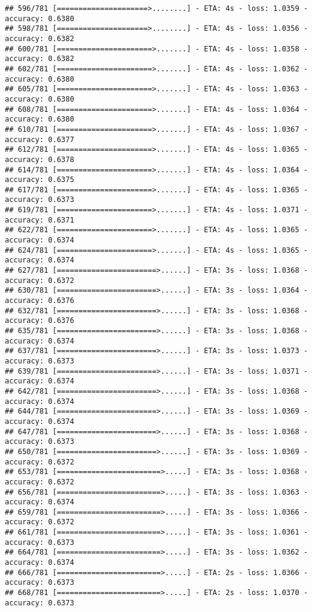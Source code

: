 \documentclass[
]{article}
\begin{document}
\begin{verbatim}
## 596/781 [=====================>........] - ETA: 4s - loss: 1.0359 - accuracy: 0.6380
## 598/781 [=====================>........] - ETA: 4s - loss: 1.0356 - accuracy: 0.6382
## 600/781 [======================>.......] - ETA: 4s - loss: 1.0358 - accuracy: 0.6382
## 602/781 [======================>.......] - ETA: 4s - loss: 1.0362 - accuracy: 0.6380
## 605/781 [======================>.......] - ETA: 4s - loss: 1.0363 - accuracy: 0.6380
## 608/781 [======================>.......] - ETA: 4s - loss: 1.0364 - accuracy: 0.6380
## 610/781 [======================>.......] - ETA: 4s - loss: 1.0367 - accuracy: 0.6377
## 612/781 [======================>.......] - ETA: 4s - loss: 1.0365 - accuracy: 0.6378
## 614/781 [======================>.......] - ETA: 4s - loss: 1.0364 - accuracy: 0.6375
## 617/781 [======================>.......] - ETA: 4s - loss: 1.0365 - accuracy: 0.6373
## 619/781 [======================>.......] - ETA: 4s - loss: 1.0371 - accuracy: 0.6371
## 622/781 [======================>.......] - ETA: 4s - loss: 1.0365 - accuracy: 0.6374
## 624/781 [======================>.......] - ETA: 4s - loss: 1.0365 - accuracy: 0.6374
## 627/781 [=======================>......] - ETA: 3s - loss: 1.0368 - accuracy: 0.6372
## 630/781 [=======================>......] - ETA: 3s - loss: 1.0364 - accuracy: 0.6376
## 632/781 [=======================>......] - ETA: 3s - loss: 1.0368 - accuracy: 0.6376
## 635/781 [=======================>......] - ETA: 3s - loss: 1.0368 - accuracy: 0.6374
## 637/781 [=======================>......] - ETA: 3s - loss: 1.0373 - accuracy: 0.6373
## 639/781 [=======================>......] - ETA: 3s - loss: 1.0371 - accuracy: 0.6374
## 642/781 [=======================>......] - ETA: 3s - loss: 1.0368 - accuracy: 0.6374
## 644/781 [=======================>......] - ETA: 3s - loss: 1.0369 - accuracy: 0.6374
## 647/781 [=======================>......] - ETA: 3s - loss: 1.0368 - accuracy: 0.6373
## 650/781 [=======================>......] - ETA: 3s - loss: 1.0369 - accuracy: 0.6372
## 653/781 [========================>.....] - ETA: 3s - loss: 1.0368 - accuracy: 0.6372
## 656/781 [========================>.....] - ETA: 3s - loss: 1.0363 - accuracy: 0.6374
## 659/781 [========================>.....] - ETA: 3s - loss: 1.0366 - accuracy: 0.6372
## 661/781 [========================>.....] - ETA: 3s - loss: 1.0361 - accuracy: 0.6373
## 664/781 [========================>.....] - ETA: 3s - loss: 1.0362 - accuracy: 0.6374
## 666/781 [========================>.....] - ETA: 2s - loss: 1.0366 - accuracy: 0.6373
## 668/781 [========================>.....] - ETA: 2s - loss: 1.0370 - accuracy: 0.6373

\end{verbatim}
\end{document}
